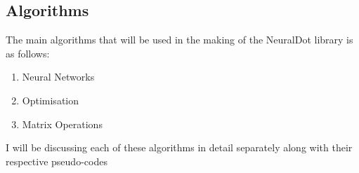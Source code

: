 \subsection{Algorithms}
The main algorithms that will be used in the making of the NeuralDot library is as follows:
\begin{enumerate}
    \item Neural Networks
    \item Optimisation
    \item Matrix Operations
\end{enumerate}

I will be discussing each of these algorithms in detail separately along with their respective pseudo-codes


